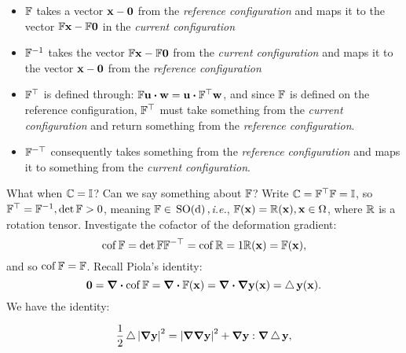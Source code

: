 \documentclass[11pt]{scrartcl} %
\begin{document}
\begin{itemize}
	\item $\mathbb{F}$ takes a vector $\vb{x}-\vb{0}$ from the \textit{reference configuration} and maps it to the vector $\mathbb{F} \vb{x}- \mathbb{F} \vb{0}$ in the \textit{current configuration}
	\item $\mathbb{F}^{-1}$ takes the vector $\mathbb{F} \vb{x} - \mathbb{F} \vb{0}$ from the \textit{current configuration} and maps it to the vector $\vb{x}-\vb{0}$ from the \textit{reference configuration}
	\item $\mathbb{F}^\top$ is defined through: $\fgrad \vb{u} \vdot \vb{w} = \vb{u} \vdot \transpose{\fgrad}\vb{w}$, and since $\mathbb{F}$ is defined on the reference configuration, $\mathbb{F}^\top$ must take something from the \textit{current configuration} and return something from the \textit{reference configuration}.
	\item $\mathbb{F}^{-\top}$ consequently takes something from the \textit{reference configuration} and maps it to something from the \textit{current configuration}.
\end{itemize}	
	What when $\mathbb{C} = \mathbb{I}$? Can we say something about $\mathbb{F}$? Write $\mathbb{C} = \mathbb{F}^\top\mathbb{F} = \mathbb{I}$, so $\mathbb{F}^\top = \mathbb{F}^{-1}, \det \mathbb{F} > 0$, meaning $\mathbb{F} \in \, \text{SO(d)} \,,$\textit{i.e.}, $\mathbb{F}(\vb{x}) = \mathbb{R}(\vb{x}), \vb{x} \in \Omega$, where $\mathbb{R}$ is a rotation tensor. Investigate the cofactor of the deformation gradient:
	\[
		\operatorname{cof} \mathbb{F} = \det \mathbb{F} \mathbb{F}^{-\top} = \operatorname{cof} \mathbb{R} = 1 \mathbb{R}(\vb{x}) = \mathbb{F} (\vb{x}),
	\]
and so $\operatorname{cof} \mathbb{F} = \mathbb{F}$. Recall Piola's identity:
\[
	\vb{0} = \divergence{\cof \fgrad} = \divergence{\fgrad (\vb{x})} =  \divergence{\grad \vb{y}\qty(\vb{x})} = \laplace \vb{y}(\vb{x}).
\]
We have the identity:

\begin{equation*}
	\frac{1}{2} \operatorname{\bigtriangleup} \abs{\grad\vb{y}}^{2} = \abs{\grad \grad \vb{y}}^{2} + \grad{\vb{y}} : \grad \operatorname{\bigtriangleup} \vb{y},
\end{equation*}
\end{document}
